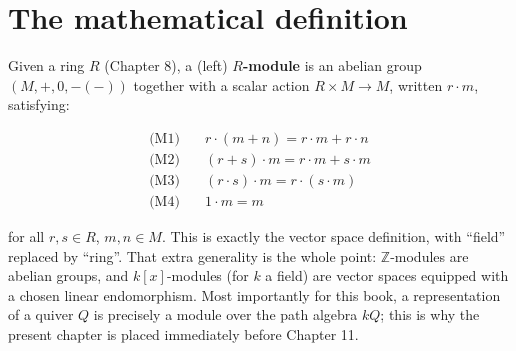 \section{The mathematical definition}\label{sec:10-modules:01-definition:1}

Given a ring \(R\) (Chapter 8), a (left) \textbf{\(R\)-module} is an abelian group \((M, +, 0, -(-))\) together with a scalar action \(R \times M \to M\), written \(r \cdot m\), satisfying:

\[
\begin{aligned}
\text{(M1)}&\quad r \cdot (m + n) = r\cdot m + r \cdot n \\
\text{(M2)}&\quad (r + s) \cdot m = r \cdot m + s \cdot m \\
\text{(M3)}&\quad (r \cdot s) \cdot m = r \cdot (s \cdot m) \\
\text{(M4)}&\quad 1 \cdot m = m
\end{aligned}
\]

for all \(r, s \in R\), \(m, n \in M\). This is exactly the vector space definition, with ``field'' replaced by ``ring''. That extra generality is the whole point: \(\mathbb{Z}\)-modules are abelian groups, and \(k[x]\)-modules (for \(k\) a field) are vector spaces equipped with a chosen linear endomorphism. Most importantly for this book, a representation of a quiver \(Q\) is precisely a module over the path algebra \(kQ\); this is why the present chapter is placed immediately before Chapter 11.
